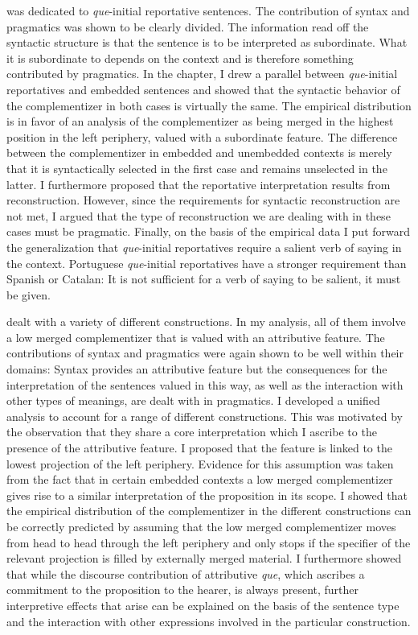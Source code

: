  was dedicated to  \emph{que}-initial reportative sentences. The contribution of syntax and pragmatics was shown to be clearly divided. The information read off  the syntactic structure is that the sentence is to be interpreted as  subordinate. What it is  subordinate to depends on the context and is therefore something   contributed by pragmatics. In the chapter, I drew a parallel between \emph{que}-initial reportatives and embedded sentences and showed that the syntactic behavior of the complementizer in both cases is virtually the same.  The empirical distribution is in favor of an  analysis of the complementizer as being merged in the highest position in the left periphery, valued  with a subordinate feature. The difference between the complementizer in  embedded and unembedded contexts is merely that it is syntactically selected in the first case and remains unselected in the latter.  I furthermore proposed that the reportative interpretation results from reconstruction. However, since the requirements for syntactic reconstruction are not met, I argued that the  type of reconstruction we are dealing with in these cases must be pragmatic. Finally, on the basis of the empirical data I put forward the generalization that \emph{que}-initial reportatives require a salient verb of saying in the context. Portuguese \emph{que}-initial reportatives have a stronger requirement than  Spanish or Catalan: It is not sufficient for a verb of saying to be salient, it must be given. 


 dealt with a variety of different constructions. In my analysis, all of them involve a low merged complementizer that is valued with an attributive feature. The contributions of syntax and pragmatics were again shown to be well within their domains: Syntax provides an attributive feature but the consequences for the interpretation of the  sentences valued in this way, as well as the interaction with other types of meanings, are dealt with in pragmatics. I developed a  unified analysis to account for a range of different constructions. This was motivated by the observation that they share a core interpretation which I ascribe to the presence of the attributive feature.  I proposed that the  feature is linked to the lowest projection of the left periphery. Evidence for this assumption was taken from the fact that in certain embedded contexts a low merged complementizer gives rise to a similar interpretation of the proposition in its scope. I showed that the empirical distribution of the complementizer in the different constructions  can be  correctly predicted by assuming that the low merged complementizer moves from head to head through the left periphery and only stops if the specifier of the relevant projection is filled by externally merged material. I furthermore showed that while the discourse contribution of attributive \emph{que}, which  ascribes a commitment to the proposition to the hearer, is always present, further interpretive effects that arise  can be explained on the basis of the sentence type and the interaction with other expressions involved in the particular construction. 

